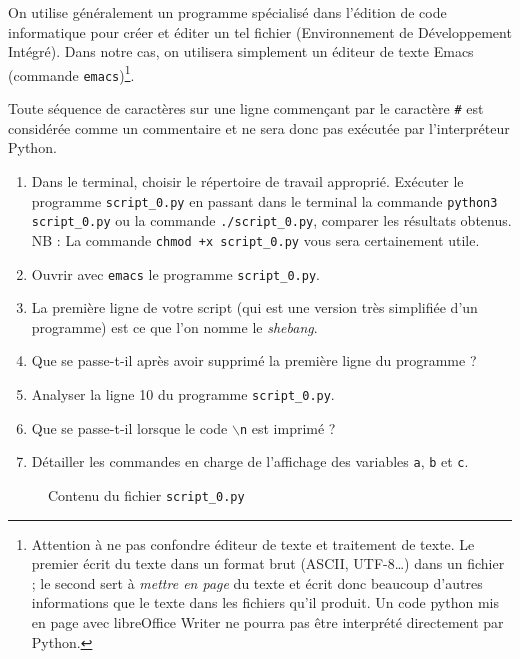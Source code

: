 On utilise généralement un programme spécialisé dans l'édition
de code informatique pour créer et éditer un tel fichier
(Environnement de Développement Intégré). Dans notre cas,
on utilisera simplement un éditeur de texte Emacs
(commande \texttt{emacs})\footnote{Attention à ne
  pas confondre éditeur de texte et traitement de texte.
  Le premier écrit du texte dans un format brut (ASCII, UTF-8\ldots)
  dans un fichier ; le second sert à \emph{mettre en page} du
  texte et écrit donc beaucoup d'autres informations que
  le texte dans les fichiers qu'il produit. Un code python mis en
  page avec libreOffice Writer ne pourra pas être interprété
  directement par Python.}.


Toute séquence de caractères sur une ligne
commençant par le caractère \verb+#+  est considérée comme un commentaire
et ne sera donc pas exécutée par l'interpréteur Python.

\begin{enumerate}
\item Dans le terminal, choisir le répertoire de travail approprié.
  Exécuter  le programme \texttt{script\_0.py} en  passant dans le
  terminal  la commande  \texttt{python3 script\_0.py}  ou la  commande
  \texttt{./script\_0.py}, comparer les résultats obtenus.\\
  NB : La commande \verb-chmod +x script_0.py- vous sera
  certainement utile. 

\item Ouvrir avec \texttt{emacs} le programme \texttt{script\_0.py}.

\item La première ligne de  votre script (qui est une version
  très simplifiée d'un programme) est ce que l'on nomme le \emph{shebang}.

\item Que  se passe-t-il après  avoir supprimé  la première  ligne du
  programme ?

\item Analyser la ligne 10 du programme \texttt{script\_0.py}.

\item Que se passe-t-il lorsque le code \texttt{$\backslash$n} est imprimé ?

\item Détailler les commandes en  charge de l'affichage des variables
  \texttt{a}, \texttt{b} et \texttt{c}.


\end{enumerate}
\begin{figure}  
  
  \caption{Contenu du fichier \texttt{script\_0.py}}
  \label{polynome_script_0}
\end{figure}





